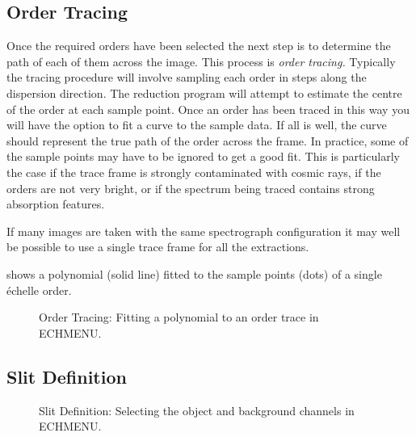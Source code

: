 \subsection{\label{se_order_tracing}Order Tracing}

Once the required orders have been selected the next step is to
determine the path of each of them across the image.  This process is {\sl
order tracing.}  Typically the tracing procedure will involve sampling
each order in steps along the dispersion direction.  The reduction
program will attempt to estimate the centre of the order at each sample
point.  Once an order has been traced in this way you will have the
option to fit a curve to the sample data.  If all is well, the curve
should represent the true path of the order across the frame.  In
practice, some of the sample points may have to be ignored to get a good
fit.  This is particularly the case if the trace frame is strongly
contaminated with cosmic rays, if the orders are not very bright, or if
the spectrum being traced contains strong absorption features.

If many images are taken with the same spectrograph configuration it may
well be possible to use a single trace frame for all the extractions.

 shows a polynomial
(solid line) fitted to the sample points (dots) of a single
\'{e}chelle order.

\begin{figure}
\begin{center}
{\leavevmode\epsfysize=136mm}

\parbox{140mm}{
\caption{Order Tracing: Fitting a polynomial to an order trace in ECHMENU.}
\label{fi_trace_plot}
}
\end{center}
\end{figure}

\subsection{\label{se_slit_definition}Slit Definition}

\begin{figure}
\begin{center}
{\leavevmode\epsfysize=136mm}

\parbox{140mm}{
\caption{Slit Definition: Selecting the object and background channels in
ECHMENU.}
\label{fi_slit_definition}
}
\end{center}
\end{figure}

